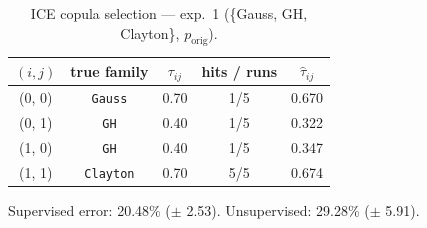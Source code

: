 \begin{table}[htbp]
  \centering
  \caption{ICE copula selection — exp.\ 1 (\{Gauss, GH, Clayton\}, $p_{\text{orig}}$).}
  \label{tab:exp3-exp1_orig_p}
  \begin{tabular}{ccccc}
    \toprule
    $(i, j)$ & true family & $\tau_{ij}$ & hits / runs & $\hat\tau_{ij}$ \\
    \midrule
    (0, 0) & \texttt{Gauss} & 0.70 & 1/5 & 0.670 \\
    (0, 1) & \texttt{GH} & 0.40 & 1/5 & 0.322 \\
    (1, 0) & \texttt{GH} & 0.40 & 1/5 & 0.347 \\
    (1, 1) & \texttt{Clayton} & 0.70 & 5/5 & 0.674 \\
    \bottomrule
  \end{tabular}
  \par\smallskip Supervised error: 20.48\% ($\pm$ 2.53). Unsupervised: 29.28\% ($\pm$ 5.91).
\end{table}
